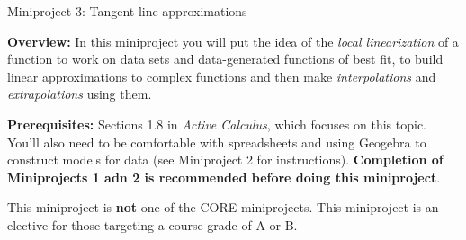 \documentclass[11pt,letterpaper]{article}
\begin{document}
\begin{flushright}
	\begin{Large}
		Miniproject 3: Tangent line approximations
	\end{Large}
\end{flushright}

\noindent
\textbf{Overview:} In this miniproject you will put the idea of the \emph{local linearization} of a function to work on data sets and data-generated functions of best fit, to build linear approximations to complex functions and then make \emph{interpolations} and \emph{extrapolations} using them. 

\medskip

\noindent
\textbf{Prerequisites:} Sections 1.8 in \emph{Active Calculus}, which focuses on this topic. You'll also need to be comfortable with spreadsheets and using Geogebra to construct models for data (see Miniproject 2 for instructions). \textbf{Completion of Miniprojects 1 adn 2 is recommended before doing this miniproject}. 

\medskip

\noindent
This miniproject is \textbf{not} one of the CORE miniprojects. This miniproject is an elective for those targeting a course grade of A or B. 
	

\hrulefill
\end{document}
